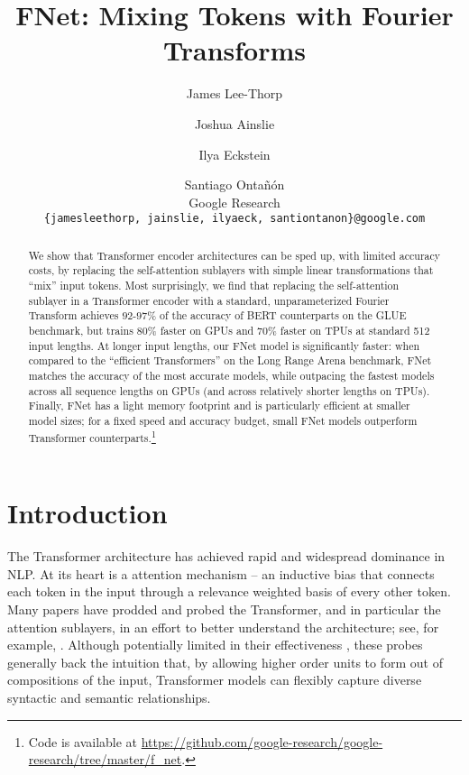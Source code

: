 \documentclass[11pt]{article}
\title{FNet: Mixing Tokens with Fourier Transforms}
\author{
  James Lee-Thorp \and Joshua Ainslie \and Ilya Eckstein \and Santiago Onta\~{n}\'{o}n \\
  Google Research \\
  \texttt{\{jamesleethorp, jainslie, ilyaeck, santiontanon\}@google.com}
}
\begin{document}
\maketitle

\begin{abstract}
  We show that Transformer encoder architectures can be sped up, with limited accuracy costs, by replacing the self-attention sublayers with simple linear transformations that ``mix'' input tokens. Most surprisingly, we find that replacing the self-attention sublayer in a Transformer encoder with a standard, unparameterized Fourier Transform achieves $92$-$97\%$ of the accuracy of BERT counterparts on the GLUE benchmark, but trains $80\%$ faster on GPUs and $70\%$ faster on TPUs at standard 512 input lengths. At longer input lengths, our FNet model is significantly faster:  when compared to the ``efficient Transformers'' on the Long Range Arena benchmark, FNet matches the accuracy of the most accurate models, while outpacing the fastest models across all sequence lengths on GPUs (and across relatively shorter lengths on TPUs). Finally, FNet has a light memory footprint and is particularly efficient at smaller model sizes; for a fixed speed and accuracy budget, small FNet models outperform Transformer counterparts.\footnote{Code is available at \url{https://github.com/google-research/google-research/tree/master/f_net}.}
\end{abstract}


\section{Introduction}
\label{sec:introduction}

The Transformer architecture \citep{vaswani2017attention} has achieved rapid and widespread dominance in NLP. At its heart is a attention mechanism -- an inductive bias that connects each token in the input through a relevance weighted basis of every other token. Many papers have prodded and probed the Transformer, and in particular the attention sublayers, in an effort to better understand the architecture; see, for example, \citet{tenney-etal-2019-bert, vig-belinkov-2019-analyzing, clark-etal-2019-bert, voita-etal-2019-analyzing}. Although potentially limited in their effectiveness \citep{hewitt-liang-2019-designing}, these probes generally back the intuition that, by allowing higher order units to form out of compositions of the input, Transformer models can flexibly capture diverse syntactic and semantic relationships. 
\end{document}
